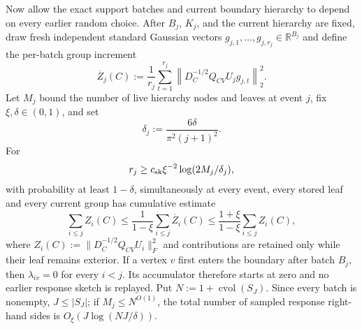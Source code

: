 \begin{theorem}
Now allow the exact support batches and current boundary hierarchy to depend
on every earlier random choice.  After $B_j$, $K_j$, and the current hierarchy
are fixed, draw fresh independent standard Gaussian vectors
$g_{j,1},\ldots,g_{j,r_j}\in\mathbb R^{B_j}$ and define the per-batch group
increment
\begin{equation}
 \overline Z_j(C)
 :=\frac1{r_j}\sum_{t=1}^{r_j}
 \left\|D_C^{-1/2}Q_{CV}U_jg_{j,t}\right\|_2^2.
 \label{eq:append-only-group-mass-increment}
\end{equation}
Let $M_j$ bound the number of live hierarchy nodes and leaves at event $j$,
fix $\xi,\delta\in(0,1)$, and set
\begin{equation}
 \delta_j:=\frac{6\delta}{\pi^2(j+1)^2}.
 \label{eq:adaptive-sketch-failure-budget}
\end{equation}
For
\begin{equation}
 r_j\geq c_{\rm sk}\xi^{-2}\log(2M_j/\delta_j),
 \label{eq:adaptive-sketch-count}
\end{equation}
with probability at least $1-\delta$, simultaneously at every event, every
stored leaf and every current group has cumulative estimate
\begin{equation}
 \sum_{i\leq j}Z_i(C)
 \leq
 \frac1{1-\xi}\sum_{i\leq j}\overline Z_i(C)
 \leq
 \frac{1+\xi}{1-\xi}\sum_{i\leq j}Z_i(C),
 \label{eq:adaptive-cumulative-group-oracle}
\end{equation}
where
$Z_i(C):=\|D_C^{-1/2}Q_{CV}U_i\|_F^2$ and contributions are retained only
while their leaf remains exterior.  If a vertex $v$ first enters the boundary
after batch $B_j$, then $\lambda_{iv}=0$ for every $i<j$.  Its accumulator
therefore starts at zero and no earlier response sketch is replayed.  Put
$N:=1+\operatorname{cvol}(S_J)$.  Since every batch is nonempty,
$J\leq |S_J|$; if $M_j\leq N^{O(1)}$, the total number of sampled response
right-hand sides is $O_\xi(J\log(NJ/\delta))$.
\end{theorem}

